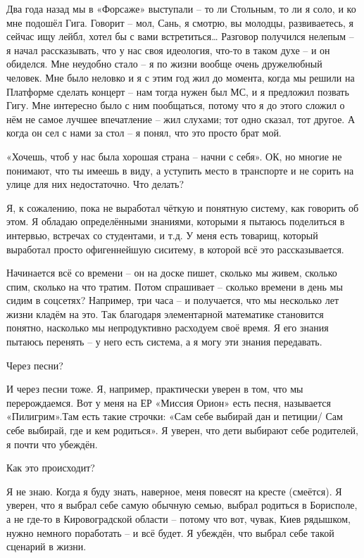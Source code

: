 Два года назад мы в «Форсаже» выступали – то ли Стольным, то ли я соло, и ко мне подошёл Гига. Говорит – мол, Сань, я смотрю, вы молодцы, развиваетесь, я сейчас ищу лейбл, хотел бы с вами встретиться… Разговор получился нелепым – я начал рассказывать, что у нас своя идеология, что-то в таком духе – и он обиделся. Мне неудобно стало – я по жизни вообще очень дружелюбный человек. Мне было неловко и я с этим год жил до момента, когда мы решили на Платформе сделать концерт – нам тогда нужен был МС, и я предложил позвать Гигу. Мне интересно было с ним пообщаться, потому что я до этого сложил о нём не самое лучшее впечатление – жил слухами; тот одно сказал, тот другое. А когда он сел с нами за стол – я понял, что это просто брат мой.

«Хочешь, чтоб у нас была хорошая страна – начни с себя». ОК, но многие не понимают, что ты имеешь в виду, а уступить место в транспорте и не сорить на улице для них недостаточно. Что делать?

Я, к сожалению, пока не выработал чёткую и понятную систему, как говорить об этом. Я обладаю определёнными знаниями, которыми я пытаюсь поделиться в интервью, встречах со студентами, и т.д. У меня есть товарищ, который выработал просто офигеннейшую сиситему, в которой всё это рассказывается.

Начинается всё со времени – он на доске пишет, сколько мы живем, сколько спим, сколько на что тратим. Потом спрашивает – сколько времени в день мы сидим в соцсетях? Например, три часа – и получается, что мы несколько лет жизни кладём на это. Так благодаря элементарной математике становится понятно, насколько мы непродуктивно расходуем своё время. Я его знания пытаюсь перенять – у него есть система, а я могу эти знания передавать.

Через песни?

И через песни тоже. Я, например, практически уверен в том, что мы перерождаемся. Вот у меня на ЕР «Миссия Орион» есть песня, называется «Пилигрим».Там есть такие строчки: «Сам себе выбирай дан и петиции/ Сам себе выбирай, где и кем родиться». Я уверен, что дети выбирают себе родителей, я почти что убеждён.

Как это происходит?

Я не знаю. Когда я буду знать, наверное, меня повесят на кресте (смеётся). Я
уверен, что я выбрал себе самую обычную семью, выбрал родиться в Борисполе, а
не где-то в Кировоградской области – потому что вот, чувак, Киев рядышком,
нужно немного поработать – и всё будет. Я убеждён, что выбрал себе такой
сценарий в жизни.

